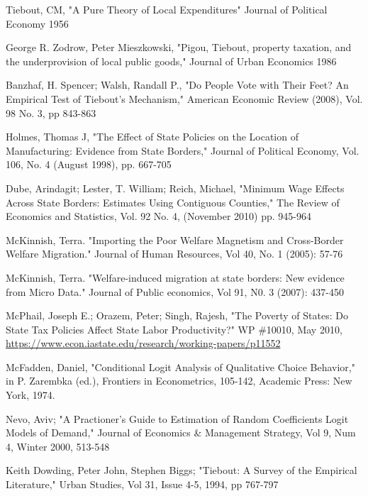\documentclass[12pt,a4paper]{article}
\begin{document}
\newpage
\begin{thebibliography}{99}

Tiebout, CM, "A Pure Theory of Local Expenditures" Journal of Political Economy 1956

George R. Zodrow, Peter Mieszkowski, "Pigou, Tiebout, property taxation, and the underprovision of local public goods," Journal of Urban Economics 1986

Banzhaf, H. Spencer; Walsh, Randall P., "Do People Vote with Their Feet? An Empirical Test of Tiebout's Mechanism," American Economic Review (2008), Vol. 98 No. 3, pp 843-863

Holmes, Thomas J, "The Effect of State Policies on the Location of Manufacturing: Evidence from State Borders," Journal of Political Economy, Vol. 106, No. 4 (August 1998), pp. 667-705

Dube, Arindagit; Lester, T. William; Reich, Michael, "Minimum Wage Effects Across State Borders: Estimates Using Contiguous Counties," The Review of Economics and Statistics, Vol. 92 No. 4, (November 2010) pp. 945-964

McKinnish, Terra. "Importing the Poor Welfare Magnetism and Cross-Border Welfare Migration." Journal of Human Resources, Vol 40, No. 1 (2005): 57-76

McKinnish, Terra. "Welfare-induced migration at state borders: New evidence from Micro Data." Journal of Public economics, Vol 91, N0. 3 (2007): 437-450

McPhail, Joseph E.; Orazem, Peter; Singh, Rajesh, "The Poverty of States: Do State Tax Policies Affect State Labor Productivity?" WP \#10010, May 2010, \url{https://www.econ.iastate.edu/research/working-papers/p11552}

McFadden, Daniel, "Conditional Logit Analysis of Qualitative Choice Behavior," in P. Zarembka (ed.), Frontiers in Econometrics, 105-142, Academic Press: New York, 1974.

Nevo, Aviv; "A Practioner's Guide to Estimation of Random Coefficients Logit Models of Demand," Journal of Economics \& Management Strategy, Vol 9, Num 4, Winter 2000, 513-548

Keith Dowding, Peter John, Stephen Biggs; "Tiebout: A Survey of the Empirical Literature," Urban Studies, Vol 31, Issue 4-5, 1994, pp 767-797


\end{thebibliography}
\end{document}
